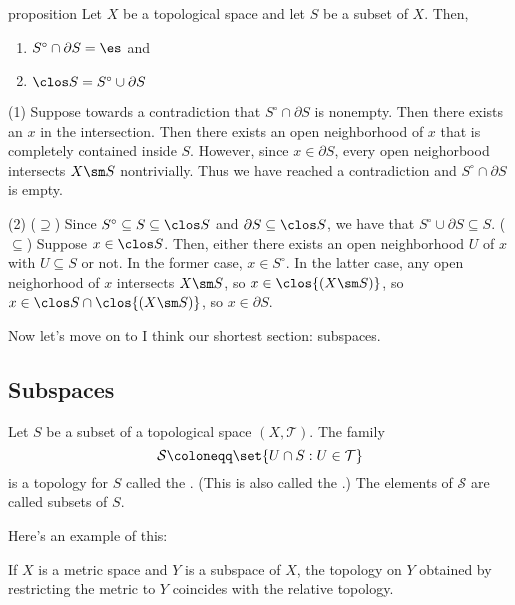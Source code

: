 \documentclass[class=article, crop=false]{standalone}
\begin{document}
\begin{result}{proposition}
  Let $X$ be a topological space and let $S$ be a subset of $X$. Then,
  \begin{enumerate}[(1)]
    \item $S^\circ \cap \partial S= \es$ and
    \item $\clos S = S^\circ \cup \partial S$
  \end{enumerate}
\end{result}
\begin{pf}
  (1) Suppose towards a contradiction that $S^\circ \cap \partial S$ is nonempty. Then there exists an $x$ in the intersection. Then there exists an open neighborhood of $x$ that is completely contained inside $S$. However, since $x \in \partial S$, every open neighorbood intersects $X \sm S$ nontrivially. Thus we have reached a contradiction and $S^\circ \cap \partial S$ is empty.

  (2) ($\supseteq$) Since $S^\circ \subseteq S \subseteq \clos S$ and $\partial S \subseteq \clos S$, we have that $S^\circ \cup \partial S \subseteq S$. ($\subseteq$) Suppose $x \in \clos S$. Then, either there exists an open neighborhood $U$ of $x$ with $U \subseteq S$ or not. In the former case, $x \in S^\circ$. In the latter case, any open neighorhood of $x$ intersects $X \sm S$, so $x \in \clos{(X \sm S)}$, so $x \in \clos S \cap \clos{(X \sm S)}$, so $x \in \partial S$.
\end{pf}

Now let's move on to I think our shortest section: subspaces.











\subsection{Subspaces}

\begin{defn}
  Let $S$ be a subset of a topological space $(X, \mathcal T)$. The family
    \[
      \mathcal S \coloneqq \set{U \cap S : U \in \mathcal T}
    \]
  is a topology for $S$ called the . (This is also called the .) The elements of $\mathcal S$ are called  subsets of $S$.
\end{defn}

Here's an example of this:
\begin{ex}
  If $X$ is a metric space and $Y$ is a subspace of $X$, the topology on $Y$ obtained by restricting the metric to $Y$ coincides with the relative topology.
\end{ex}
\end{document}
